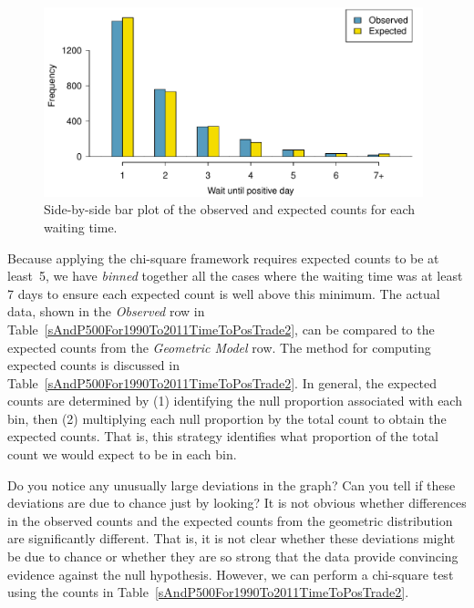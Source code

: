 \begin{figure}
\centering
\includegraphics[width=0.98\textwidth]{ch_inference_for_props/figures/geomFitEvaluationForSP500For1990To2011/geomFitEvaluationForSP500For1990To2011}
\caption{Side-by-side bar plot of the observed and expected counts for each waiting time.}
\label{geomFitEvaluationForSP500For1990To2011}
\end{figure}

Because applying the chi-square framework requires expected counts to be at least~5, we have \emph{binned} together all the cases where the waiting time was at least 7 days to ensure each expected count is well above this minimum. The actual data, shown in the \emph{Observed} row in Table~\ref{sAndP500For1990To2011TimeToPosTrade2}, can be compared to the expected counts from the \emph{Geometric Model} row. The method for computing expected counts is discussed in Table~\ref{sAndP500For1990To2011TimeToPosTrade2}. In general, the expected counts are determined by (1) identifying the null proportion associated with each bin, then (2) multiplying each null proportion by the total count to obtain the expected counts. That is, this strategy identifies what proportion of the total count we would expect to be in each bin.

\begin{example}{Do you notice any unusually large deviations in the graph? Can you tell if these deviations are due to chance just by looking?}
It is not obvious whether differences in the observed counts and the expected counts from the geometric distribution are significantly different. That is, it is not clear whether these deviations might be due to chance or whether they are so strong that the data provide convincing evidence against the null hypothesis. However, we can perform a chi-square test using the counts in Table~\ref{sAndP500For1990To2011TimeToPosTrade2}.
\end{example}

